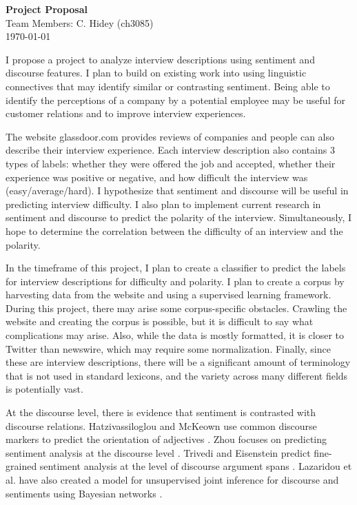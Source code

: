 \documentclass[12pt]{article}
\begin{document}
\begin{center}
  \textbf{Project Proposal} \\
  Team Members: C. Hidey (ch3085) \\
  \today
\end{center}

I propose a project to analyze interview descriptions using sentiment and discourse features.  I plan to build on existing work into using linguistic connectives that may identify similar or contrasting sentiment. Being able to identify the perceptions of a company by a potential employee may be useful for customer relations and to improve interview experiences.

The website glassdoor.com provides reviews of companies and people can 
also describe their interview experience.  Each interview description also contains 3 types of labels: whether they were offered the job and accepted, whether their experience was positive or negative, and how difficult the interview was (easy/average/hard).  I hypothesize that sentiment and discourse will be useful in predicting interview difficulty.  I also plan to implement current research in sentiment and discourse to predict the polarity of the interview.  Simultaneously, I hope to determine the correlation between the difficulty of an interview and the polarity.  

In the timeframe of this project, I plan to create a classifier to predict the labels for interview descriptions for difficulty and polarity.  I plan to create a corpus by harvesting data from the website and using a supervised learning framework.  During this project, there may arise some corpus-specific obstacles.  Crawling the website and creating the corpus is possible, but it is difficult to say what complications may arise.  Also, while the data is mostly formatted, it is closer to Twitter than newswire, which may require some normalization.  Finally, since these are interview descriptions, there will be a significant amount of terminology that is not used in standard lexicons, and the variety across many different fields is potentially vast.

At the discourse level, there is evidence that sentiment is contrasted with discourse relations.  Hatzivassiloglou and McKeown use common discourse markers to predict the orientation of adjectives \cite{hatzi}.  Zhou focuses on predicting sentiment analysis at the discourse level \cite{zhou}.  Trivedi and Eisenstein predict fine-grained sentiment analysis at the level of discourse argument spans \cite{trivedi}.  Lazaridou et al. have also created a model for unsupervised joint inference for discourse and sentiments using Bayesian networks \cite{lazaridou}.
\end{document}
